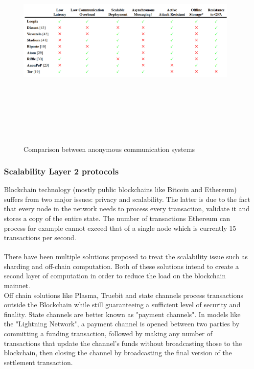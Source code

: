 \begin{figure}[H]
    \centering
    \includegraphics[width=11cm,height=11cm,keepaspectratio]{../whitepaper/images/state-of-the-art.png}
    \caption{Comparison between anonymous communication systems}
    \label{fig:Comparison between anonymous communication systems}
\end{figure}


\subsubsection{Scalability Layer 2 protocols}
Blockchain technology (mostly public blockchains like Bitcoin and Ethereum) suffers from two major issues: privacy and scalability. The latter is due to the fact that every node in the network needs to process every transaction, validate it and stores a copy of the entire state. The number of transactions Ethereum can process for example cannot exceed that of a single node which is currently 15 transactions per second.
\\~\\There have been multiple solutions proposed to treat the scalability issue such as sharding and off-chain computation. Both of these solutions intend to create a second layer of computation in order to reduce the load on the blockchain mainnet.
\\Off chain solutions like Plasma, Truebit and state channels process transactions outside the Blockchain while still guaranteeing a sufficient level of security and finality. State channels are better known as "payment channels". In models like the "Lightning Network", a payment channel is opened between two parties by committing a funding transaction, followed by making any number of transactions that update the channel's funds without broadcasting those to the blockchain, then closing the channel by broadcasting the final version of the settlement transaction.
